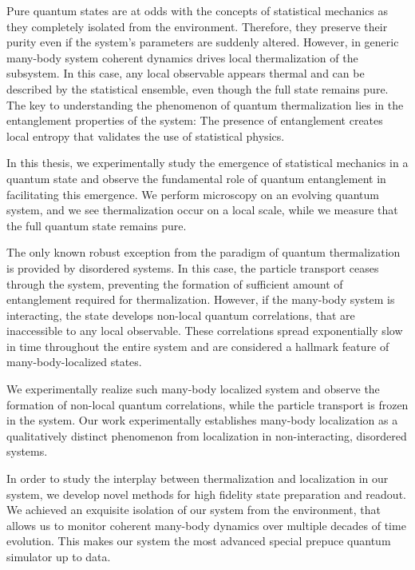 
Pure quantum states are at odds with the concepts of statistical mechanics as they completely isolated from the environment. Therefore, they preserve their purity even if the system's parameters are suddenly altered. However, in
generic many-body system coherent dynamics drives local thermalization of the subsystem. In this case, any local observable appears thermal and can be described by the statistical ensemble, even though the full state remains pure. The key to understanding the phenomenon of quantum thermalization lies in the entanglement properties of the system: The presence of entanglement creates local entropy that validates the use of statistical physics.

In this thesis, we experimentally study the emergence of statistical mechanics in a quantum state and observe the fundamental role of quantum entanglement in facilitating this emergence. We perform microscopy on an evolving quantum system, and we see thermalization occur on a local scale, while we measure that the full quantum state remains pure.

The only known robust exception from the paradigm of quantum thermalization is provided by disordered systems. In this case, the particle transport ceases through the system, preventing the formation of sufficient amount of entanglement required for thermalization. However, if the many-body system is interacting, the state develops non-local quantum correlations, that are inaccessible to any local observable. These correlations spread exponentially slow in time throughout the entire system and are considered a hallmark feature of many-body-localized states.

We experimentally realize such many-body localized system and observe the formation of non-local quantum correlations, while the particle transport is frozen in the system. Our work experimentally establishes many-body localization as a qualitatively distinct phenomenon from localization in non-interacting, disordered systems.

In order to study the interplay between thermalization and localization in our system, we develop novel methods for high fidelity state preparation and readout. We achieved an exquisite isolation of our system from the environment, that allows us to monitor coherent many-body dynamics over multiple decades of time evolution. This makes our system the most advanced special prepuce quantum simulator up to data.